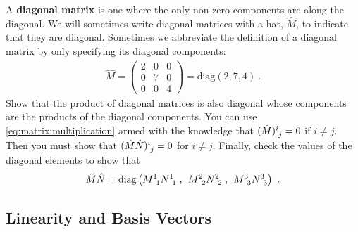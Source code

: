 \documentclass[12pt]{article}
\begin{document}
\begin{exercise}\label{ex:product:of:diagonal:matrices}
A \textbf{diagonal matrix} is one where the only non-zero components are along the diagonal. We will sometimes write diagonal matrices with a hat, $\hat M$, to indicate that they are diagonal. Sometimes we abbreviate the definition of a diagonal matrix by only specifying its diagonal components:
\begin{align}
    \hat M = 
    \begin{pmatrix}
        2 & 0 & 0 \\
        0 & 7 & 0 \\
        0 & 0 & 4  
    \end{pmatrix}
    =
    \text{diag}(2,7,4) \ .
\end{align}
Show that the product of diagonal matrices is also diagonal whose components are the products of the diagonal components. You can use \eqref{eq:matrix:multiplication} armed with the knowledge that $(\hat M)\aij{i}{j} = 0$ if $i\neq j$. Then you must show that $(\hat M \hat N)\aij{i}{j} = 0$ for $i\neq j$. Finally, check the values of the diagonal elements to show that
\begin{align}
    \hat M \hat N = \text{diag}\left(M\aij11 N\aij11 \;,\;\, M\aij22 N\aij 22 \;,\;\, M\aij33 N\aij 33\right) \ .
\end{align}

\end{exercise}


\subsection{Linearity and Basis Vectors}
\end{document}
